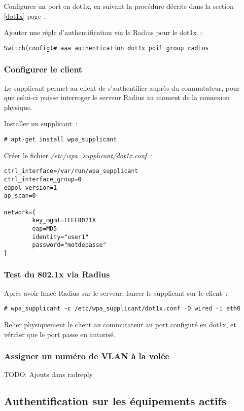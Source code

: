 Configurer un port en dot1x, en suivant la procédure décrite dans la section \ref{dot1x} page \pageref{dot1x}.

Ajouter une règle d'authentification via le Radius pour le dot1x~:
\begin{verbatim}
Switch(config)# aaa authentication dot1x poil group radius
\end{verbatim}

\subsubsection{Configurer le client}

Le supplicant permet au client de s'authentifier auprès du commutateur, pour que celui-ci puisse interroger le serveur Radius au moment de la connexion physique.

Installer un supplicant~:
\begin{verbatim}
# apt-get install wpa_supplicant
\end{verbatim}

Créer le fichier \emph{/etc/wpa\_supplicant/dot1x.conf}~:
\begin{verbatim}
ctrl_interface=/var/run/wpa_supplicant
ctrl_interface_group=0
eapol_version=1
ap_scan=0

network={
        key_mgmt=IEEE8021X
        eap=MD5
        identity="user1"
        password="motdepasse"
}
\end{verbatim}

\subsubsection{Test du 802.1x via Radius}

Après avoir lancé Radius sur le serveur, lancer le supplicant sur le client~:
\begin{verbatim}
# wpa_supplicant -c /etc/wpa_supplicant/dot1x.conf -D wired -i eth0
\end{verbatim}

Relier physiquement le client au commutateur au port configuré en dot1x, et vérifier que le port passe en autorisé.

\subsubsection{Assigner un numéro de VLAN à la volée}

TODO: Ajouts dans radreply

\subsection{Authentification sur les équipements actifs}
